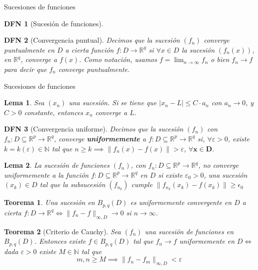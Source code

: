 \documentclass[a4paper]{article}\usepackage{/home/alonso/Documents/Projects/formularios/styles}
\newtheorem{definition}{DFN}
\theoremstyle{mytheoremstyle}
\newtheorem{theorem}{Teorema}
\newtheorem{lemma}{Lema}
\newcommand{\R}{\mathbb{R}}
\newcommand{\N}{\mathbb{N}}
\newcommand{\1}{\mathds{1}}
\newcommand{\norm}[1]{\left\|#1\right\|}
\begin{document}
\begin{multicols*}{3}
\begin{roundbox}{Sucesiones de funciones}
\begin{definition}[Sucesión de funciones]
\end{definition}

\begin{definition}[Convergencia puntual]
    Decimos que la sucesión $(f_n)$ converge puntualmente en $D$ a cierta función $f:D \to \R^{q}$ si $\forall x \in D$ la sucesión $(f_n (x))$, en $\R^{q}$, converge a $f(x)$.
    Como notación, usamos $f = \lim_{n\to \infty} f_n$ o bien $f_n \to f$ para decir que $f_n$ converge puntualmente.
\end{definition}
\end{roundbox}

\begin{roundbox}{Sucesiones de funciones}
\begin{lemma}
    Sea $(x_n)$ una sucesión.
    Si se tiene que $|x_n - L| \leq C \cdot a_n$ con $a_n \to 0$, y $C >0$ constante, entonces $x_n$ converge a $L$.
\end{lemma}

\begin{definition}[Convergencia uniforme]
    Decimos que la sucesión $(f_n)$ con $f_n: D \subseteq \R^{p} \to \R^{q}$, converge \textbf{uniformemente} a $f: D \subseteq \R^{p} \to \R^{q}$ si, $\forall \varepsilon > 0$, existe $k=k(\varepsilon) \in \N$ tal que $n \geq k \implies \norm{f_n(x) - f(x)} > \varepsilon$,
    $\boldsymbol{\forall x \in D}$.
\end{definition}

\begin{lemma}
La sucesión de funciones $(f_n)$, con $f_n:D\subseteq\R^{p}\to\R^{q}$, no converge uniformemente a la función $f:D\subseteq\R^{p}\to\R^{q}$ en $D$ si existe $\varepsilon_0>0$, una sucesión $(x_k) \in D$ tal que la subsucesión $(f_{n_k})$ cumple $\|f_{n_k}(x_k)-f(x_k)\|\geq\epsilon_0$
\end{lemma}

\begin{theorem}
Una sucesión en $B_{p,q}(D)$ es uniformemente convergente en $D$ a cierta $f:D\to\R^{q} \iff \|f_n-f\|_{\infty,D}\to0$ si $n\to\infty$.
\end{theorem}

\begin{theorem}[Criterio de Cauchy]
Sea $(f_n)$ una sucesión de funciones en $B_{p,q}(D)$. Entonces existe $f\in B_{p,q}(D)$ tal que $f_n\to f$ uniformemente en $D \iff$ dada $\varepsilon>0$ existe $M\in\N$ tal que
\[
m,n\geq M \implies \|f_n-f_m\|_{\infty,D}<\varepsilon
\]
\end{theorem}


\end{roundbox}
\end{multicols*}
\end{document}
